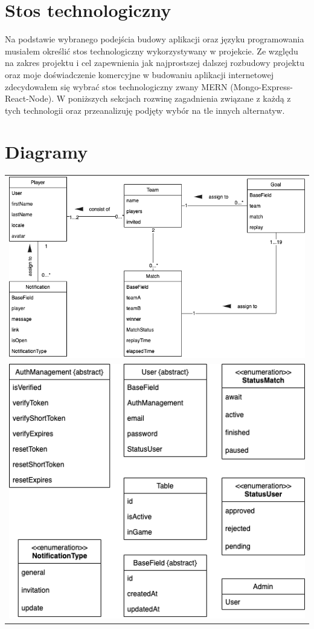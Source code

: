 \section{Stos technologiczny}
Na podstawie wybranego podejścia budowy aplikacji oraz języku programowania musiałem określić stos technologiczny wykorzystywany w projekcie.
Ze względu na zakres projektu i cel zapewnienia jak najprostszej dalszej rozbudowy projektu oraz moje doświadczenie komercyjne w budowaniu aplikacji internetowej zdecydowałem się wybrać stos technologiczny zwany MERN (Mongo-Express-React-Node). W poniższych sekcjach rozwinę zagadnienia związane z każdą z tych technologii oraz przeanalizuję podjęty wybór na tle innych alternatyw.

\section{Diagramy}

\begin{tabular}{c}
    \includegraphics[width=\textwidth]{images/diagrams/class_diagram.png}  \\
    \includegraphics[width=\textwidth]{images/diagrams/class_diagram_rest.png}
\end{tabular}

